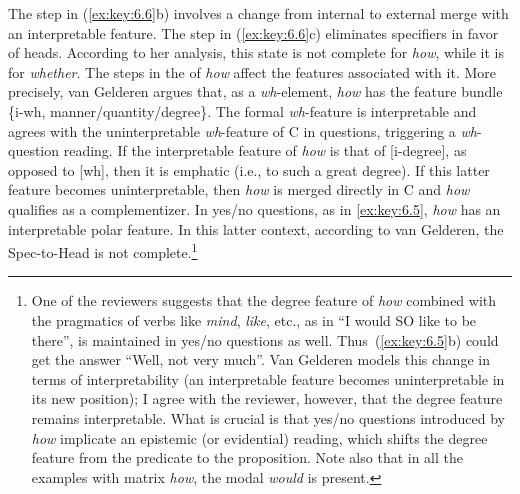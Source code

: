 \documentclass[output=paper]{langsci/langscibook}
\begin{document}
The step in (\ref{ex:key:6.6}b) involves a change from internal to external
merge with an interpretable feature. The step in (\ref{ex:key:6.6}c) eliminates
specifiers in favor of heads. According to her analysis, this state is not
complete for \emph{how}, while it is for \emph{whether}. The steps in the
 of \emph{how} affect the features associated with it. More
precisely, van Gelderen argues that, as a \emph{wh}-element, \emph{how} has the
feature bundle \{i-wh, manner/quantity/degree\}. The formal \emph{wh}-feature
is interpretable and agrees with the uninterpretable \emph{wh}-feature of C in
questions, triggering a \emph{wh}-question reading. If the interpretable
feature of \emph{how} is that of [i-degree], as opposed to [wh], then it is
emphatic (i.e., to such a great degree). If this latter feature becomes
uninterpretable, then \emph{how} is merged directly in C and \emph{how}
qualifies as a complementizer. In yes/no questions, as in
\eqref{ex:key:6.5}, \emph{how} has an interpretable polar feature. In this
latter context, according to van Gelderen, the Spec-to-Head  is
not complete.\footnote{One of the reviewers suggests that the degree feature of
    \emph{how} combined with the pragmatics of verbs like \emph{mind},
    \emph{like}, etc., as in “I would SO like to be there”, is maintained in
    yes/no questions as well. Thus~(\ref{ex:key:6.5}b) could get the answer “Well, not very
    much”. Van Gelderen models this change in terms of interpretability (an
    interpretable feature becomes uninterpretable in its new position); I agree
    with the reviewer, however, that the degree feature remains interpretable.
    What is crucial is that yes/no questions introduced by \emph{how} implicate
    an epistemic (or evidential) reading, which shifts the degree feature from
    the predicate to the proposition.  Note also that in all the examples with
matrix \emph{how}, the modal \emph{would} is present.}
\end{document}
